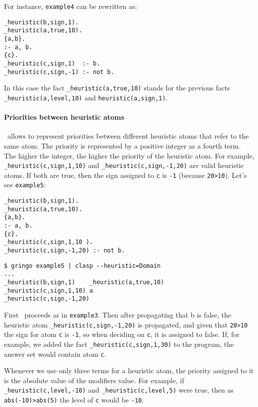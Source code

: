 For instance, \texttt{example4} can be rewritten as: 
\begin{verbatim}
_heuristic(b,sign,1).
_heuristic(a,true,10).
{a,b}.
:- a, b.
{c}.
_heuristic(c,sign,1)  :- b.
_heuristic(c,sign,-1) :- not b.
\end{verbatim}

In this case the fact \texttt{\_heuristic(a,true,10)} stands for the previous 
facts \texttt{\_heuristic(a,level,10)} and \texttt{heuristic(a,sign,1)}. 

\paragraph{Priorities between heuristic atoms}

\clasp\ allows to represent priorities between different heuristic atoms that refer to the same atom.  
The priority is represented by a positive integer as a fourth term. 
The higher the integer, the higher the priority of the heuristic atom. 
For example, \texttt{\_heuristic(c,sign,1,10)} and \texttt{\_heuristic(c,sign,-1,20)} are valid heuristic atoms. 
If both are true, then the sign assigned to \texttt{c} is \texttt{-1} (because \texttt{20>10}).  Let's see \texttt{example5}: 
\begin{verbatim}
_heuristic(b,sign,1).
_heuristic(a,true,10).
{a,b}.
:- a, b.
{c}.
_heuristic(c,sign,1,10 ).
_heuristic(c,sign,-1,20) :- not b.
\end{verbatim}
\begin{verbatim}
$ gringo example5 | clasp --heuristic=Domain                                                                                
...
_heuristic(b,sign,1)    _heuristic(a,true,10) 
_heuristic(c,sign,1,10) a
_heuristic(c,sign,-1,20)\end{verbatim}

First \clasp\ proceeds as in \texttt{example3}. 
Then after propagating that b is false,  the heuristic atom \texttt{\_heuristic(c,sign,-1,20)} is propagated, 
and given that \texttt{20>10} the sign for atom \texttt{c} is \texttt{-1}, so when deciding on \texttt{c}, it is assigned to false.  
If, for example, we added the fact \texttt{\_heuristic(c,sign,1,30)} to the program, the answer set would contain atom \texttt{c}. 

Whenever we use only three terms for a heuristic atom, the priority assigned to it is the absolute value of the modifiers value.  
For example, if \texttt{\_heuristic(c,level,-10)} and \texttt{\_heuristic(c,level,5)} were true,  
then as \texttt{abs(-10)>abs(5)} the level of \texttt{c} would be \texttt{-10}. 

